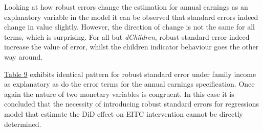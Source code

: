\documentclass{article}
\begin{document}
Looking at how robust errors change the estimation for annual earnings as an explanatory variable in the model it can be observed that standard errors indeed change in value slightly. However, the direction of change is not the same for all terms, which is surprising. For all but \textit{dChildren}, robust standard error indeed increase the value of error, whilst the children indicator behaviour goes the other way around.

\hyperref[tab:robustfinc]{Table 9} exhibits identical pattern for robust standard error under family income as explanatory as do the error terms for the annual earnings specification. Once again the nature of two monetary variables is congruent. In this case it is concluded that the necessity of introducing robust standard errors for regressions model that estimate the DiD effect on EITC intervention cannot be directly determined. 
\end{document}
